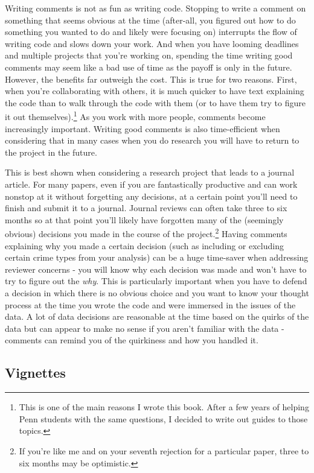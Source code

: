 \documentclass[
]{krantz}
\begin{document}
Writing comments is not as fun as writing code. Stopping to
write a comment on something that seems obvious at the time
(after-all, you figured out how to do something you wanted
to do and likely were focusing on) interrupts the flow of
writing code and slows down your work. And when you have
looming deadlines and multiple projects that you're working
on, spending the time writing good comments may seem like a
bad use of time as the payoff is only in the future.
However, the benefits far outweigh the cost. This is true
for two reasons. First, when you're collaborating with
others, it is much quicker to have text explaining the code
than to walk through the code with them (or to have them try
to figure it out themselves).\footnote{This is one of the
  main reasons I wrote this book. After a few years of
  helping Penn students with the same questions, I decided
  to write out guides to those topics.} As you work with
more people, comments become increasingly important. Writing
good comments is also time-efficient when considering that
in many cases when you do research you will have to return
to the project in the future.

This is best shown when considering a research project that
leads to a journal article. For many papers, even if you are
fantastically productive and can work nonstop at it without
forgetting any decisions, at a certain point you'll need to
finish and submit it to a journal. Journal reviews can often
take three to six months so at that point you'll likely have
forgotten many of the (seemingly obvious) decisions you made
in the course of the project.\footnote{If you're like me and
  on your seventh rejection for a particular paper, three to
  six months may be optimistic.} Having comments explaining
why you made a certain decision (such as including or
excluding certain crime types from your analysis) can be a
huge time-saver when addressing reviewer concerns - you will
know why each decision was made and won't have to try to
figure out the \emph{why}. This is particularly important
when you have to defend a decision in which there is no
obvious choice and you want to know your thought process at
the time you wrote the code and were immersed in the issues
of the data. A lot of data decisions are reasonable at the
time based on the quirks of the data but can appear to make
no sense if you aren't familiar with the data - comments can
remind you of the quirkiness and how you handled it.

\hypertarget{vignettes}{%
\subsection{Vignettes}\label{vignettes}}
\end{document}
